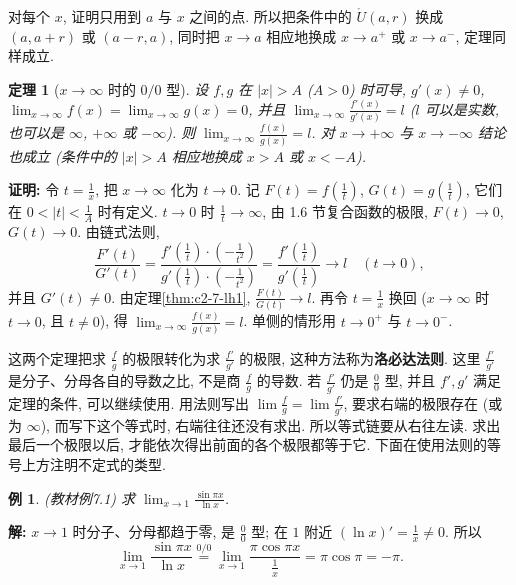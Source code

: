 \documentclass[UTF8,openany]{ctexbook}
\theoremstyle{chinesetextbook}
\newtheorem{example}{例}[section]
\newtheorem{theorem}{定理}[section]
\newenvironment{cnproof}{\par\indent\textbf{证明:} \ignorespaces}{\par}
\newenvironment{cnsolution}{\par\indent\textbf{解:} \ignorespaces}{\par}
\begin{document}
对每个 $x$, 证明只用到 $a$ 与 $x$ 之间的点. 所以把条件中的 $\mathring U(a,r)$ 换成 $(a,a+r)$ 或 $(a-r,a)$, 同时把 $x\to a$ 相应地换成 $x\to a^+$ 或 $x\to a^-$, 定理同样成立.
\begin{theorem}[$x\to\infty$ 时的 $0/0$ 型]\label{thm:c2-7-lh2}
设 $f,g$ 在 $|x|>A$ ($A>0$) 时可导, $g'(x)\ne0$, $\displaystyle\lim_{x\to\infty}f(x)=\lim_{x\to\infty}g(x)=0$, 并且 $\displaystyle\lim_{x\to\infty}\frac{f'(x)}{g'(x)}=l$ ($l$ 可以是实数, 也可以是 $\infty$, $+\infty$ 或 $-\infty$). 则 $\displaystyle\lim_{x\to\infty}\frac{f(x)}{g(x)}=l$. 对 $x\to+\infty$ 与 $x\to-\infty$ 结论也成立 (条件中的 $|x|>A$ 相应地换成 $x>A$ 或 $x<-A$).
\end{theorem}
\begin{cnproof}
令 $\displaystyle t=\frac1x$, 把 $x\to\infty$ 化为 $t\to0$. 记 $\displaystyle F(t)=f\left(\frac1t\right)$, $\displaystyle G(t)=g\left(\frac1t\right)$, 它们在 $\displaystyle0<|t|<\frac1A$ 时有定义. $t\to0$ 时 $\displaystyle\frac1t\to\infty$, 由 1.6 节复合函数的极限, $F(t)\to0$, $G(t)\to0$. 由链式法则,
\[
\frac{F'(t)}{G'(t)}=\frac{f'\left(\frac1t\right)\cdot\left(-\frac1{t^2}\right)}{g'\left(\frac1t\right)\cdot\left(-\frac1{t^2}\right)}=\frac{f'\left(\frac1t\right)}{g'\left(\frac1t\right)}\to l\quad(t\to0),
\]
并且 $G'(t)\ne0$. 由定理\ref{thm:c2-7-lh1}, $\displaystyle\frac{F(t)}{G(t)}\to l$. 再令 $\displaystyle t=\frac1x$ 换回 ($x\to\infty$ 时 $t\to0$, 且 $t\ne0$), 得 $\displaystyle\lim_{x\to\infty}\frac{f(x)}{g(x)}=l$. 单侧的情形用 $t\to0^+$ 与 $t\to0^-$.
\end{cnproof}
这两个定理把求 $\displaystyle\frac fg$ 的极限转化为求 $\displaystyle\frac{f'}{g'}$ 的极限, 这种方法称为\textbf{洛必达法则}. 这里 $\displaystyle\frac{f'}{g'}$ 是分子、分母各自的导数之比, 不是商 $\displaystyle\frac fg$ 的导数. 若 $\displaystyle\frac{f'}{g'}$ 仍是 $\displaystyle\frac00$ 型, 并且 $f',g'$ 满足定理的条件, 可以继续使用. 用法则写出 $\displaystyle\lim\frac fg=\lim\frac{f'}{g'}$, 要求右端的极限存在 (或为 $\infty$), 而写下这个等式时, 右端往往还没有求出. 所以等式链要从右往左读. 求出最后一个极限以后, 才能依次得出前面的各个极限都等于它. 下面在使用法则的等号上方注明不定式的类型.
\begin{example}\label{ex:c2-7-1}
\textnormal{(教材例7.1)} 求 $\displaystyle\lim_{x\to1}\frac{\sin\pi x}{\ln x}$.
\end{example}
\begin{cnsolution}
$x\to1$ 时分子、分母都趋于零, 是 $\displaystyle\frac00$ 型; 在 $1$ 附近 $\displaystyle(\ln x)'=\frac1x\ne0$. 所以
\[
\lim_{x\to1}\frac{\sin\pi x}{\ln x}\overset{0/0}{=}\lim_{x\to1}\frac{\pi\cos\pi x}{\frac1x}=\pi\cos\pi=-\pi.
\]
\end{cnsolution}
\end{document}
